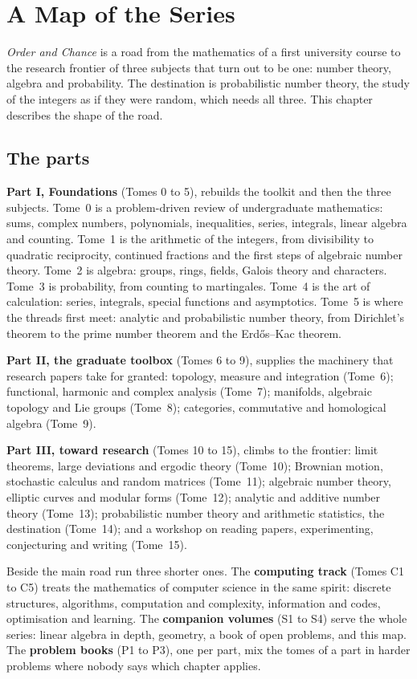 \chapter{A Map of the Series}\label{ch:map}

\emph{Order and Chance} is a road from the mathematics of a first university course to the research frontier of
three subjects that turn out to be one: number theory, algebra and probability. The destination is probabilistic
number theory, the study of the integers as if they were random, which needs all three. This chapter describes the
shape of the road.

\section{The parts}

\textbf{Part I, Foundations} (Tomes 0 to 5), rebuilds the toolkit and then the three subjects. Tome~0 is a
problem-driven review of undergraduate mathematics: sums, complex numbers, polynomials, inequalities, series,
integrals, linear algebra and counting. Tome~1 is the arithmetic of the integers, from divisibility to quadratic
reciprocity, continued fractions and the first steps of algebraic number theory. Tome~2 is algebra: groups, rings,
fields, Galois theory and characters. Tome~3 is probability, from counting to martingales. Tome~4 is the art of
calculation: series, integrals, special functions and asymptotics. Tome~5 is where the threads first meet: analytic
and probabilistic number theory, from Dirichlet's theorem to the prime number theorem and the Erd\H os--Kac theorem.

\textbf{Part II, the graduate toolbox} (Tomes 6 to 9), supplies the machinery that research papers take for granted:
topology, measure and integration (Tome~6); functional, harmonic and complex analysis (Tome~7); manifolds, algebraic
topology and Lie groups (Tome~8); categories, commutative and homological algebra (Tome~9).

\textbf{Part III, toward research} (Tomes 10 to 15), climbs to the frontier: limit theorems, large deviations and
ergodic theory (Tome~10); Brownian motion, stochastic calculus and random matrices (Tome~11); algebraic number theory,
elliptic curves and modular forms (Tome~12); analytic and additive number theory (Tome~13); probabilistic number theory
and arithmetic statistics, the destination (Tome~14); and a workshop on reading papers, experimenting, conjecturing and
writing (Tome~15).

Beside the main road run three shorter ones. The \textbf{computing track} (Tomes C1 to C5) treats the mathematics of
computer science in the same spirit: discrete structures, algorithms, computation and complexity, information and
codes, optimisation and learning. The \textbf{companion volumes} (S1 to S4) serve the whole series: linear algebra in
depth, geometry, a book of open problems, and this map. The \textbf{problem books} (P1 to P3), one per part, mix the
tomes of a part in harder problems where nobody says which chapter applies.

